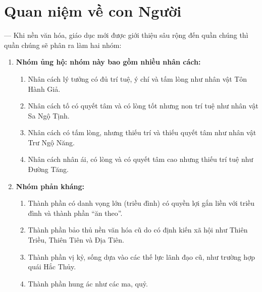 \section{Quan niệm về con Người} %
\label{sec:43_con_nguoi}

— Khi nền văn hóa, giáo dục mới được giới thiệu sâu rộng đến quần chúng thì quần chúng sẽ phân ra làm hai nhóm:

\begin{enumerate}[label=\itshape\arabic*\upshape)]

    \item {\bf Nhóm ủng hộ: nhóm này bao gồm nhiều nhân cách:}

    \begin{enumerate}[label=\itshape\alph*\upshape)]

        \item Nhân cách lý tưởng có đủ trí tuệ, ý chí và tấm lòng như nhân vật Tôn Hành Giả.

        \item Nhân cách tố có quyết tâm và có lòng tốt nhưng non trí tuệ như nhân vật Sa Ngộ Tịnh.

        \item Nhân cách có tấm lòng, nhưng thiếu trí và thiếu quyết tâm như nhân vật Trư Ngộ Năng.

        \item Nhân cách nhân ái, có lòng và có quyết tâm cao nhưng thiếu trí tuệ như Đường Tăng.
    \end{enumerate}

    \item {\bf Nhóm phản kháng:}

    \begin{enumerate}[label=\itshape\alph*\upshape)]

        \item Thành phần có danh vọng lớn (triều đình) có quyền lợi gắn liền với triều đình và thành phần ``ăn theo''.

        \item Thành phần bảo thủ nền văn hóa cũ do có định kiến xã hội như Thiên Triều, Thiên Tiên và Địa Tiên.

        \item Thành phần vị kỷ, sống dựa vào các thế lực lãnh đạo cũ, như trường hợp quái Hắc Thủy.

        \item Thành phần hung ác như các ma, quỷ.
    \end{enumerate}
\end{enumerate}

